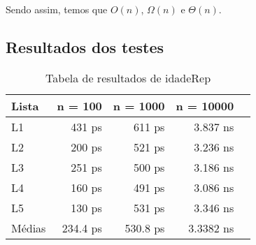 Sendo assim, temos que $O(n)$, $\Omega(n)$ e $\Theta(n)$.

\subsection{Resultados dos testes}


\begin{table}[h!]
	\centering
	\caption{Tabela de resultados de idadeRep}
	\label{tab:perf_result}
	\begin{tabular}{lrrrr}
		\toprule
		Lista   & n = 100   & n = 1000  & n = 10000 \\
		\midrule
		L1      & 431 ps    & 611 ps    & 3.837 ns  \\
		L2      & 200 ps    & 521 ps    & 3.236 ns  \\
		L3      & 251 ps    & 500 ps    & 3.186 ns  \\
		L4      & 160 ps    & 491 ps    & 3.086 ns  \\
		L5      & 130 ps    & 531 ps    & 3.346 ns  \\
		\midrule
		Médias  & 234.4 ps  & 530.8 ps  & 3.3382 ns \\
		\bottomrule
	\end{tabular}
\end{table}


